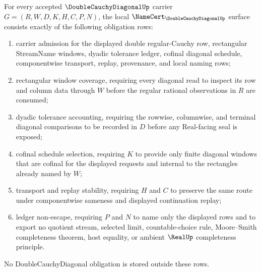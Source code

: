 \begin{theorem}
\label{thm:double-cauchy-diagonal-namecert-obligations}
For every accepted $\DoubleCauchyDiagonalUp$ carrier $G=(R,W,D,K,H,C,P,N)$, the local $\NameCert_{\DoubleCauchyDiagonalUp}$ surface consists exactly of the following obligation rows:
\begin{enumerate}
\item carrier admission for the displayed double regular-Cauchy row, rectangular StreamName windows, dyadic tolerance ledger, cofinal diagonal schedule, componentwise transport, replay, provenance, and local naming rows;
\item rectangular window coverage, requiring every diagonal read to inspect its row and column data through $W$ before the regular rational observations in $R$ are consumed;
\item dyadic tolerance accounting, requiring the rowwise, columnwise, and terminal diagonal comparisons to be recorded in $D$ before any Real-facing seal is exposed;
\item cofinal schedule selection, requiring $K$ to provide only finite diagonal windows that are cofinal for the displayed requests and internal to the rectangles already named by $W$;
\item transport and replay stability, requiring $H$ and $C$ to preserve the same route under componentwise sameness and displayed continuation replay;
\item ledger non-escape, requiring $P$ and $N$ to name only the displayed rows and to export no quotient stream, selected limit, countable-choice rule, Moore--Smith completeness theorem, host equality, or ambient $\RealUp$ completeness principle.
\end{enumerate}
No DoubleCauchyDiagonal obligation is stored outside these rows.
\end{theorem}
